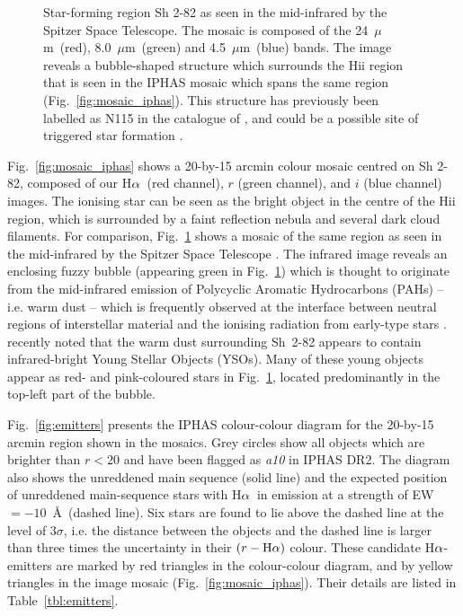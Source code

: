\documentclass[a4paper,useAMS,usenatbib]{mn2e}
\def\ha{\mbox{H$\rm \alpha$}}
\def\micron{\mbox{$\mu$m}}
\begin{document}
\begin{figure}
\begin{minipage}[b]{0.8\linewidth}
    \end{minipage}
    \caption{Star-forming region Sh 2-82 as seen in the mid-infrared
    by the Spitzer Space Telescope. The mosaic is composed of the 24~\micron\ (red), 8.0~\micron\ (green) and 4.5~\micron\ (blue) bands.
    The image reveals a bubble-shaped structure which surrounds the {\sc Hii} region that is seen in the IPHAS mosaic which spans the same region (Fig.~\ref{fig:mosaic_iphas}). 
    This structure has previously been labelled as N115 in the 
catalogue of \citet{Churchwell2006}, and could be a possible site of triggered star formation \citep{Thompson2012,Kendrew2012}.}
    \label{fig:mosaic_spitzer}
\end{figure}

Fig.~\ref{fig:mosaic_iphas} shows a 20-by-15 arcmin
colour mosaic centred on Sh 2-82,
composed of our \ha\ (red channel),
$r$ (green channel),
and $i$ (blue channel) images.
The ionising star can be seen as the bright object
in the centre of the H{\sc ii} region,
which is surrounded by a faint reflection nebula
and several dark cloud filaments.
For comparison, Fig.~\ref{fig:mosaic_spitzer} shows
a mosaic of the same region 
as seen in the mid-infrared by the Spitzer Space Telescope \citep{Benjamin2003,Churchwell2009}.
The infrared image reveals an enclosing fuzzy bubble (appearing
green in Fig.~\ref{fig:mosaic_spitzer})
which is thought to originate from the
mid-infrared emission of Polycyclic Aromatic Hydrocarbons (PAHs)
-- i.e. warm dust --
which is frequently observed
at the interface between neutral regions of interstellar material
and the ionising radiation from early-type stars \citep{Churchwell2006}.
\cite{Yu2012}
recently noted that the warm dust
surrounding Sh~2-82 
appears to contain infrared-bright
Young Stellar Objects (YSOs).
Many of these young objects 
appear as red- and pink-coloured stars
in Fig.~\ref{fig:mosaic_spitzer},
located predominantly in the top-left part
of the bubble.

Fig.~\ref{fig:emitters} presents
the IPHAS colour-colour diagram for 
the 20-by-15 arcmin region shown in the mosaics.
Grey circles show all objects
which are brighter than $r<20$
and have been flagged as \emph{a10}
in IPHAS DR2.
The diagram also shows the unreddened main sequence (solid line)
and the expected position of unreddened main-sequence stars
with \ha\ in emission
at a strength of EW$=-10$~\AA\ (dashed line).
Six stars are found to lie above the 
dashed line at the level of $3\sigma$,
i.e. the distance between the objects and the dashed line
is larger than three times the uncertainty
in their $(r-\ha)$ colour.
These candidate \ha-emitters
are marked by red triangles in the colour-colour diagram,
and by yellow triangles in the image mosaic (Fig.~\ref{fig:mosaic_iphas}).
Their details are listed in Table~\ref{tbl:emitters}.
\end{document}
